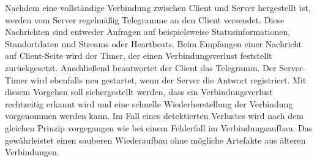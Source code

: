 \documentclass[thesis.tex]{subfiles}
\begin{document}
Nachdem eine vollständige Verbindung zwischen Client und Server hergestellt ist, werden vom Server regelmäßig Telegramme an den Client versendet.
Diese Nachrichten sind entweder Anfragen auf beispielsweise Statusinformationen, Standortdaten und Streams oder Heartbeats.
Beim Empfangen einer Nachricht auf Client-Seite wird der Timer, der einen Verbindungsverlust feststellt zurückgesetzt.
Anschließend beantwortet der Client das Telegramm.
Der Server-Timer wird ebenfalls neu gestartet, wenn der Server die Antwort registriert.
Mit diesem Vorgehen soll sichergestellt werden, dass ein Verbindungsverlust rechtzeitig erkannt wird und eine schnelle Wiederherstellung der Verbindung vorgenommen werden kann.
Im Fall eines detektierten Verlustes wird nach dem gleichen Prinzip vorgegangen wie bei einem Fehlerfall im Verbindungsaufbau.
Das gewährleistet einen sauberen Wiederaufbau ohne mögliche Artefakte aus älteren Verbindungen.

\pagebreak
\end{document}
